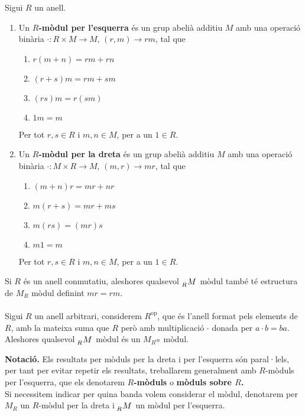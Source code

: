 \begin{definition} 
Sigui $R$ un anell. 
\begin{enumerate}
\item Un \textbf{$R$-mòdul per l'esquerra} és un grup abelià additiu $M$ amb una operació binària $\cdot : R\times M \rightarrow M$, $(r,m)\rightarrow rm$, tal que
\begin{enumerate}[$a_l$)]
\item $r(m+n)=rm+rn$
\item $(r+s)m=rm+sm$
\item $(rs)m=r(sm)$
\item $1m=m$
\end{enumerate}
Per tot $r,s\in R$ i $m,n\in M$, per a un $1\in R$.
\item Un \textbf{$R$-mòdul per la dreta} és un grup abelià additiu $M$ amb una operació binària $\cdot : M\times R \rightarrow M$, $(m,r)\rightarrow mr$, tal que
\begin{enumerate}[$a_l$)]
\item $(m+n)r=mr+nr$
\item $m(r+s)=mr+ms$
\item $m(rs)=(mr)s$
\item $m1=m$
\end{enumerate}
Per tot $r,s\in R$ i $m,n\in M$, per a un $1\in R$. 

\end{enumerate}
\end{definition}

\begin{obs}

 Si $R$ és un anell conmutatiu, aleshores qualsevol  $\tensor[_R]{M}{}$ mòdul també té estructura de $M_R$ mòdul definint $mr=rm$.
\\ \\
 Sigui $R$ un anell arbitrari, considerem $R ^{\text{op}}$, que és l'anell format pels elements de $R$, amb la mateixa suma que $R$ però amb multiplicació $\cdot $ donada per $a\cdot b = ba$. 
\\
Aleshores qualsevol $\tensor[_R]{M}{}$ mòdul és un $M_{R^\text{op}}$ mòdul.

\end{obs}

\noindent \textbf{Notació.}  Els resultats per mòduls per la dreta i per l'esquerra són paral·lels, per tant per evitar repetir els resultats, treballarem generalment amb $R$-mòduls per l'esquerra, que els denotarem \textbf{$R$-mòduls} o \textbf{mòduls sobre $R$.} \\ Si necessitem indicar per quina banda volem considerar el mòdul, denotarem per $M_R$ un $R$-mòdul per la dreta i $\tensor[_R]{M}{}$ un mòdul per l'esquerra. 

